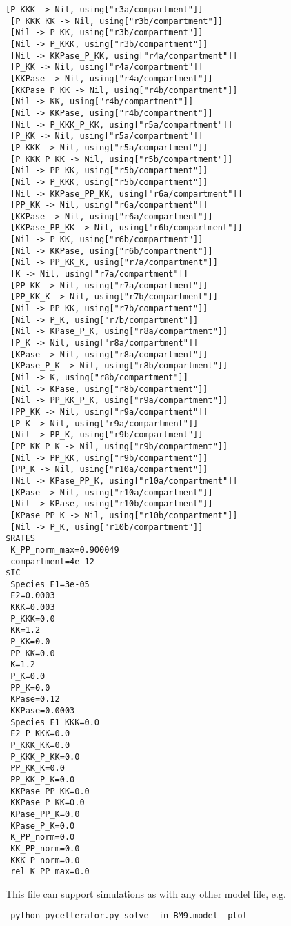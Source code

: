 \begin{lstlisting}[xleftmargin=0in,xrightmargin=0in]
 [P_KKK -> Nil, using["r3a/compartment"]]
 [P_KKK_KK -> Nil, using["r3b/compartment"]]
 [Nil -> P_KK, using["r3b/compartment"]]
 [Nil -> P_KKK, using["r3b/compartment"]]
 [Nil -> KKPase_P_KK, using["r4a/compartment"]]
 [P_KK -> Nil, using["r4a/compartment"]]
 [KKPase -> Nil, using["r4a/compartment"]]
 [KKPase_P_KK -> Nil, using["r4b/compartment"]]
 [Nil -> KK, using["r4b/compartment"]]
 [Nil -> KKPase, using["r4b/compartment"]]
 [Nil -> P_KKK_P_KK, using["r5a/compartment"]]
 [P_KK -> Nil, using["r5a/compartment"]]
 [P_KKK -> Nil, using["r5a/compartment"]]
 [P_KKK_P_KK -> Nil, using["r5b/compartment"]]
 [Nil -> PP_KK, using["r5b/compartment"]]
 [Nil -> P_KKK, using["r5b/compartment"]]
 [Nil -> KKPase_PP_KK, using["r6a/compartment"]]
 [PP_KK -> Nil, using["r6a/compartment"]]
 [KKPase -> Nil, using["r6a/compartment"]]
 [KKPase_PP_KK -> Nil, using["r6b/compartment"]]
 [Nil -> P_KK, using["r6b/compartment"]]
 [Nil -> KKPase, using["r6b/compartment"]]
 [Nil -> PP_KK_K, using["r7a/compartment"]]
 [K -> Nil, using["r7a/compartment"]]
 [PP_KK -> Nil, using["r7a/compartment"]]
 [PP_KK_K -> Nil, using["r7b/compartment"]]
 [Nil -> PP_KK, using["r7b/compartment"]]
 [Nil -> P_K, using["r7b/compartment"]]
 [Nil -> KPase_P_K, using["r8a/compartment"]]
 [P_K -> Nil, using["r8a/compartment"]]
 [KPase -> Nil, using["r8a/compartment"]]
 [KPase_P_K -> Nil, using["r8b/compartment"]]
 [Nil -> K, using["r8b/compartment"]]
 [Nil -> KPase, using["r8b/compartment"]]
 [Nil -> PP_KK_P_K, using["r9a/compartment"]]
 [PP_KK -> Nil, using["r9a/compartment"]]
 [P_K -> Nil, using["r9a/compartment"]]
 [Nil -> PP_K, using["r9b/compartment"]]
 [PP_KK_P_K -> Nil, using["r9b/compartment"]]
 [Nil -> PP_KK, using["r9b/compartment"]]
 [PP_K -> Nil, using["r10a/compartment"]]
 [Nil -> KPase_PP_K, using["r10a/compartment"]]
 [KPase -> Nil, using["r10a/compartment"]]
 [Nil -> KPase, using["r10b/compartment"]]
 [KPase_PP_K -> Nil, using["r10b/compartment"]]
 [Nil -> P_K, using["r10b/compartment"]]
$RATES
 K_PP_norm_max=0.900049
 compartment=4e-12
$IC
 Species_E1=3e-05
 E2=0.0003
 KKK=0.003
 P_KKK=0.0
 KK=1.2
 P_KK=0.0
 PP_KK=0.0
 K=1.2
 P_K=0.0
 PP_K=0.0
 KPase=0.12
 KKPase=0.0003
 Species_E1_KKK=0.0
 E2_P_KKK=0.0
 P_KKK_KK=0.0
 P_KKK_P_KK=0.0
 PP_KK_K=0.0
 PP_KK_P_K=0.0
 KKPase_PP_KK=0.0
 KKPase_P_KK=0.0
 KPase_PP_K=0.0
 KPase_P_K=0.0
 K_PP_norm=0.0
 KK_PP_norm=0.0
 KKK_P_norm=0.0
 rel_K_PP_max=0.0
\end{lstlisting}

This file can support simulations as with any other model file, e.g. 
\begin{lstlisting}
 python pycellerator.py solve -in BM9.model -plot
\end{lstlisting}

